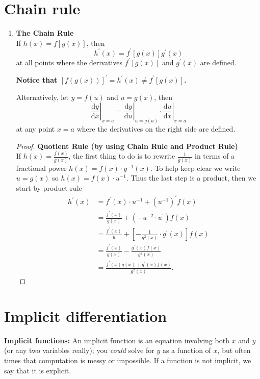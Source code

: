 \section{Chain rule}
\begin{enumerate}
    \item \textbf{The Chain Rule}\\
        \indent If \(h(x)=f[g(x)]\), then
        \[
            h^\prime (x)=f^\prime [g(x)]g^\prime (x)
        \]
        at all points where the derivatives \(f^\prime [g(x)]\) and \(g^\prime (x)\) are defined.
        \begin{note}
            \textbf{Notice that \([f(g(x))]^\prime=h^\prime (x)\neq f^\prime[g(x)]\).}
        \end{note}
        Alternatively, let \(y=f(u)\) and \(u=g(x)\), then
        \[
            \left.\frac{\mathrm{d}y}{\mathrm{d}x}\right|_{x=a}=\left.\frac{\mathrm{d}y}{\mathrm{d}u}\right|_{u=g(a)}\cdot\left.\frac{\mathrm{d}u}{\mathrm{d}x}\right|_{x=a}
        \]
        at any point \(x=a\) where the derivatives on the right side are defined.
        \begin{proof}
            \textbf{Quotient Rule (by using Chain Rule and Product Rule)}\\
            \indent If \(h(x)=\frac{f(x)}{g(x)}\), the first thing to do is to rewrite \(\frac{1}{g(x)}\) in terms of a fractional power \(h(x)=f(x)\cdot g^{-1}(x)\). To help keep clear we write \(u=g(x)\) so \(h(x)=f(x)\cdot u^{-1}\). Thus the last step is a product, then we start by product rule
            \begin{align*}
                h^\prime (x) & =f^\prime (x)\cdot u^{-1}+(u^{-1})^\prime f(x)\\
                             & =\frac{f^\prime (x)}{g(x)}+(-u^{-2}\cdot u^\prime)f(x)\\
                             & =\frac{f^\prime (x)}{u}+[-\frac{1}{g^2(x)}\cdot g^\prime (x)]f(x)\\
                             & =\frac{f^\prime (x)}{g(x)}-\frac{g^\prime (x)f(x)}{g^2(x)}\\
                             & =\frac{f^\prime (x)g(x)+g^\prime (x)f(x)}{g^2(x)}.
            \end{align*}
        \end{proof}
\end{enumerate}

\section{Implicit differentiation}
\begin{note}\textbf{Implicit functions:} An implicit function is an equation involving both \(x\) and \(y\) (or any two variables really); you \textit{could} solve for \(y\) as a function of \(x\), but often times that computation is messy or impossible. If a function is not implicit, we say that it is explicit.
\end{note}

